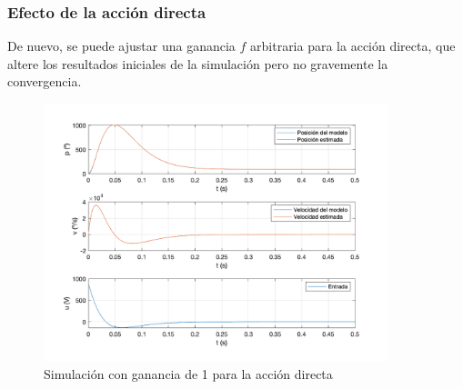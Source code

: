 \documentclass[a4paper, 12pt]{article}
\begin{document}
\subsubsection{Efecto de la acción directa}
De nuevo, se puede ajustar una ganancia $f$ arbitraria para la acción directa, que altere los resultados iniciales de la simulación pero no gravemente la convergencia. 
\begin{figure}[H]
	\centering
	\includegraphics*[height = 7.5cm]{figs/p4/ad10}

	\caption{Simulación con ganancia de 1 para la acción directa}
\end{figure}
\end{document}
